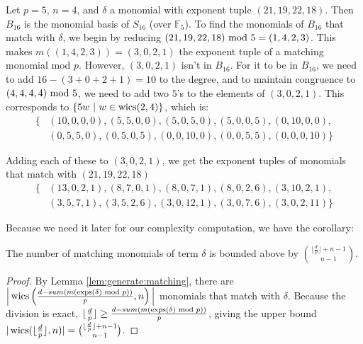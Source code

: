 \begin{ex}
    Let $p = 5$, \(n = 4\), and $\delta$ a monomial 
    with exponent tuple $(21, 19, 22, 18)$. 
    Then $B_{16}$ is the monomial basis of 
    \(S_{16}\) (over $\mathbb{F}_5$). 
    To find the monomials of $B_{16}$ that match with 
    $\delta$, we begin by reducing $(21, 19, 22, 18) \text{ mod } 5 = (1, 4, 2, 3)$.
    This makes $m((1, 4, 2, 3)) = (3, 0, 2, 1)$ the 
    exponent tuple of a matching monomial mod \(p\).
    However, \((3, 0, 2, 1)\) isn't in $B_{16}$. 
    For it to be in $B_{16}$, we need to add $16 - (3 + 0 + 2 + 1) = 10$ 
    to the degree, and to maintain congruence to 
    $(4, 4, 4, 4) \text{ mod } 5$, we need to add two $5$'s 
    to the elements of $(3, 0, 2, 1)$. This corresponds 
    to $\{5w ~|~ w \in \operatorname{wics}(2, 4)\}$, which is:
    \begin{align*}
        \{&(10, 0, 0, 0), (5, 5, 0, 0), (5, 0, 5, 0), (5, 0, 0, 5), (0, 10, 0, 0), \\
        &(0, 5, 5, 0), (0, 5, 0, 5), (0, 0, 10, 0), (0, 0, 5, 5), (0, 0, 0, 10)\}
    \end{align*}
        
    \noindent Adding each of these to $(3, 0, 2, 1)$, we get the 
    exponent tuples of monomials that match with $(21, 19, 22, 18)$
    \begin{align*}
        \{&(13, 0, 2, 1), (8, 7, 0, 1), (8, 0, 7, 1), (8, 0, 2, 6), (3, 10, 2, 1), \\
        &(3, 5, 7, 1), (3, 5, 2, 6), (3, 0, 12, 1), (3, 0, 7, 6), (3, 0, 2, 11)\}
    \end{align*}    
\end{ex}

Because we need it later for our complexity computation, we have the corollary:

\begin{cor}
    \label{cor:num:matches}
    The number of matching monomials of term $\delta$ is 
    bounded above by $\binom{\lfloor \frac{d}{p} \rfloor + n - 1}{n - 1}$.
\end{cor}

\begin{proof}
    By Lemma \ref{lem:generate:matching}, there are 
    $\Big |\operatorname{wics} \left(\frac{d - sum(m(\operatorname{exps}(\delta) \text{ mod } p))}{p}, n \right) \Big |$ 
    monomials that match with $\delta$.
    Because the division is exact, 
    $\lfloor \frac{d}{p} \rfloor \geq \frac{d - sum(m(\operatorname{exps}(\delta) \text{ mod } p))}{p}$,
    giving the upper bound 
    $|\operatorname{wics}(\lfloor \frac{d}{p} \rfloor, n)| = \binom{\lfloor \frac{d}{p} \rfloor + n - 1}{n - 1}$.
\end{proof}

